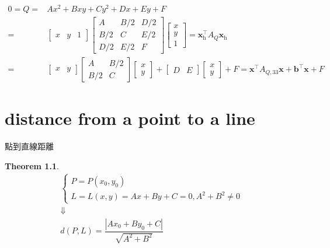 \documentclass[
]{book}
\newtheorem{theorem}{Theorem}[chapter]
\theoremstyle{definition}
\theoremstyle{definition}
\theoremstyle{definition}
\theoremstyle{definition}
\theoremstyle{remark}
\begin{document}
\[
\begin{aligned}
0=Q= & Ax^{2}+Bxy+Cy^{2}+Dx+Ey+F\\
= & \begin{bmatrix}x & y & 1\end{bmatrix}\begin{bmatrix}A & B/2 & D/2\\
B/2 & C & E/2\\
D/2 & E/2 & F
\end{bmatrix}\begin{bmatrix}x\\
y\\
1
\end{bmatrix}=\boldsymbol{x}_{{\scriptscriptstyle \text{h}}}^{\intercal}A_{{\scriptscriptstyle Q}}\boldsymbol{x}_{{\scriptscriptstyle \text{h}}}\\
= & \begin{bmatrix}x & y\end{bmatrix}\begin{bmatrix}A & B/2\\
B/2 & C
\end{bmatrix}\begin{bmatrix}x\\
y
\end{bmatrix}+\begin{bmatrix}D & E\end{bmatrix}\begin{bmatrix}x\\
y
\end{bmatrix}+F=\boldsymbol{x}^{\intercal}A_{{\scriptscriptstyle Q,33}}\boldsymbol{x}+\boldsymbol{b}^{\intercal}\boldsymbol{x}+F
\end{aligned}
\]

\chapter{distance from a point to a line}\label{distance-from-a-point-to-a-line}

\begin{CJK}{UTF8}{bsmi}
點到直線距離
\end{CJK}

\begin{theorem}
\protect\hypertarget{thm:unnamed-chunk-1}{}\label{thm:unnamed-chunk-1}\[
\begin{array}{c}
\begin{cases}
P=P\left(x_{0},y_{0}\right)\\
L=L\left(x,y\right)=Ax+By+C=0,A^{2}+B^{2}\ne0
\end{cases}\\
\Downarrow\\
d\left(P,L\right)=\dfrac{\left|Ax_{0}+By_{0}+C\right|}{\sqrt{A^{2}+B^{2}}}
\end{array}
\]
\end{theorem}
\end{document}
